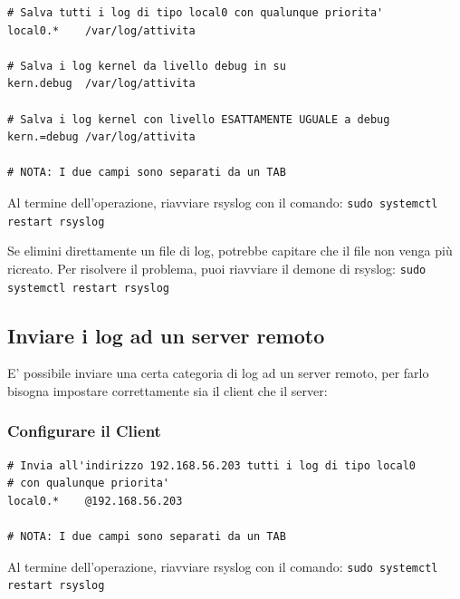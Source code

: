 \documentclass[a4paper]{report}
\newenvironment{ricordati}{\begin{tcolorbox}[fonttitle=\sffamily\bfseries\large,title=Ricordati,colframe=orange!75!white]}{\end{tcolorbox}}
\newenvironment{code}{\begin{tcolorbox}[size=small]}{\end{tcolorbox}}
\begin{document}
\begin{code}
\begin{lstlisting}
# Salva tutti i log di tipo local0 con qualunque priorita'
local0.*	/var/log/attivita

# Salva i log kernel da livello debug in su
kern.debug	/var/log/attivita

# Salva i log kernel con livello ESATTAMENTE UGUALE a debug
kern.=debug	/var/log/attivita

# NOTA: I due campi sono separati da un TAB
\end{lstlisting}
\end{code}

\begin{ricordati}
	Al termine dell'operazione, riavviare rsyslog con il comando: \texttt{sudo systemctl restart rsyslog}
\end{ricordati}

\begin{ricordati}
	Se elimini direttamente un file di log, potrebbe capitare che il file non venga più ricreato. Per risolvere il problema, puoi riavviare il demone di rsyslog: \texttt{sudo systemctl restart rsyslog}
\end{ricordati}

\subsection{Inviare i log ad un server remoto}

E' possibile inviare una certa categoria di log ad un server remoto, per farlo bisogna impostare correttamente sia il client che il server:

\subsubsection{Configurare il Client}

\begin{code}
\begin{lstlisting}
# Invia all'indirizzo 192.168.56.203 tutti i log di tipo local0 
# con qualunque priorita'
local0.*	@192.168.56.203

# NOTA: I due campi sono separati da un TAB
\end{lstlisting}
\end{code}

\begin{ricordati}
	Al termine dell'operazione, riavviare rsyslog con il comando: \texttt{sudo systemctl restart rsyslog}
\end{ricordati}
\end{document}
